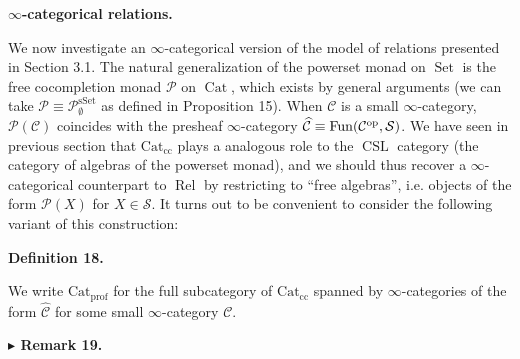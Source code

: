 \documentclass[10pt,a4paper]{article}
\begin{document}
 
 
 
\par\medskip\noindent\textbf{$\infty$-categorical relations.}\par
 
 
We now investigate an $\infty$-categorical version of the model of relations presented in Section 3.1. The natural generalization of the powerset monad on $\operatorname{Set}$ is the free cocompletion monad $\mathcal{P}$ on $\operatorname{Cat}$, which exists by general arguments (we can take $\mathcal{P}\equiv{\mathcal{P}}_{\emptyset}^{\operatorname{sSet}}$ as defined in Proposition 15). When $\mathcal{C}$ is a small $\infty$-category, $\mathcal{P}(\mathcal{C})$ coincides with the presheaf $\infty$-category $\widehat{\mathcal{C}}\equiv\operatorname{Fun}(\mathcal{C}^{\textnormal{op}},\mathcal{S})$. We have seen in previous section that $\operatorname{Cat_{cc}}$ plays a analogous role to the $\operatorname{CSL}$ category (the category of algebras of the powerset monad), and we should thus recover a $\infty$-categorical counterpart to $\operatorname{Rel}$ by restricting to “free algebras”, i.e. objects of the form $\mathcal{P}(X)$ for $X\in\mathcal{S}$. It turns out to be convenient to consider the following variant of this construction:\par
 
 
 
\par\medskip\noindent\textbf{Definition 18.}\par
 
 
We write $\operatorname{Cat_{prof}}$ for the full subcategory of $\operatorname{Cat_{cc}}$ spanned by $\infty$-categories of the form $\widehat{{\mathcal{C}}}$ for some small $\infty$-category ${\mathcal{C}}$.\par
 
 
 
 
\par\medskip\noindent\textbf{$\blacktriangleright$ Remark 19.}\par
 
\end{document}
